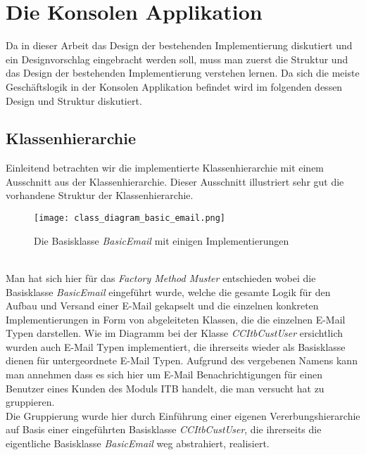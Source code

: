 \chapter{Die Konsolen Applikation}
\label{cha:the-console-app}
Da in dieser Arbeit das Design der bestehenden Implementierung diskutiert und ein Designvorschlag eingebracht werden soll, muss man zuerst die Struktur und das Design der bestehenden Implementierung verstehen lernen. Da sich die meiste Geschäftslogik in der Konsolen Applikation befindet wird im folgenden dessen Design und Struktur diskutiert.
\newpage

\section{Klassenhierarchie}
\label{sec:console-app-class-hierarchie}
Einleitend betrachten wir die implementierte Klassenhierarchie mit einem Ausschnitt aus der Klassenhierarchie. Dieser Ausschnitt illustriert sehr gut die vorhandene Struktur der Klassenhierarchie.
\begin{figure}[h]
\centering
\texttt{[image: class\_diagram\_basic\_email.png]} %
\caption{Die Basisklasse \emph{BasicEmail} mit einigen Implementierungen}
\label{fig:system-old}
\end{figure}
\ \\
Man hat sich hier für das \emph{Factory Method Muster} entschieden wobei die Basisklasse \emph{BasicEmail} eingeführt wurde, welche die gesamte Logik für den Aufbau und Versand einer E-Mail gekapselt und die einzelnen konkreten Implementierungen in Form von abgeleiteten Klassen, die die einzelnen E-Mail Typen darstellen. Wie im Diagramm bei der Klasse \emph{CCItbCustUser} ersichtlich wurden auch E-Mail Typen implementiert, die ihrerseits wieder als Basisklasse dienen für untergeordnete E-Mail Typen. Aufgrund des vergebenen Namens kann man annehmen dass es sich hier um E-Mail Benachrichtigungen für einen Benutzer eines Kunden des Moduls ITB handelt, die man versucht hat zu gruppieren.\\
Die Gruppierung wurde hier durch Einführung einer eigenen Vererbungshierarchie auf Basis einer eingeführten Basisklasse \emph{CCItbCustUser}, die ihrerseits die eigentliche Basisklasse \emph{BasicEmail} weg abstrahiert, realisiert. 
\newpage

